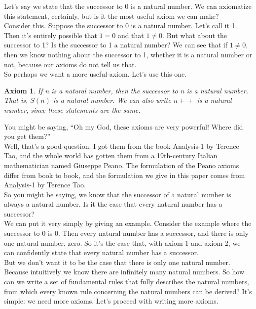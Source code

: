 \documentclass{article}
\newtheorem{axiom}{Axiom}
\newcommand{\inc}[1]{\mathrel{{{#1}+}+}}
\begin{document}
Let's say we state that the successor to 0 is a natural number. We can axiomatize this statement, certainly, but is it the most useful axiom we can make? \\

Consider this. Suppose the successor to 0 is a natural number. Let's call it 1. Then it's entirely possible that $1 = 0$ and that $1 \neq 0$. But what about the successor to 1? Is the successor to 1 a natural number? We can see that if $1 \neq 0$, then we know nothing about the successor to 1, whether it is a natural number or not, because our axioms do not tell us that. \\

So perhaps we want a more useful axiom. Let's use this one. 

\begin{axiom}
If n is a natural number, then the successor to n is a natural number. That is, $S(n)$ is a natural number. We can also write $\inc{n}$ is a natural number, since these statements are the same.
\end{axiom}

You might be saying, ``Oh my God, these axioms are very powerful! Where did you get them?'' \\

Well, that's a good question. I got them from the book Analysis-1 by Terence Tao, and the whole world has gotten them from a 19th-century Italian mathematician named Giuseppe Peano. The formulation of the Peano axioms differ from book to book, and the formulation we give in this paper comes from Analysis-1 by Terence Tao. \\

So you might be saying, we know that the successor of a natural number is always a natural number. Is it the case that every natural number has a successor? \\

We can put it very simply by giving an example. Consider the example where the successor to 0 is 0. Then every natural number has a successor, and there is only one natural number, zero. So it's the case that, with axiom 1 and axiom 2, we can confidently state that every natural number has a successor. \\

But we don't want it to be the case that there is only one natural number. Because intuitively we know there are infinitely many natural numbers. So how can we write a set of fundamental rules that fully describes the natural numbers, from which every known rule concerning the natural numbers can be derived? It's simple: we need more axioms. Let's proceed with writing more axioms.
\end{document}
